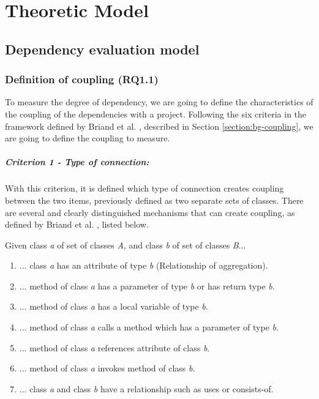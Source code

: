 \chapter{Theoretic Model}\label{ch:TheoreticModel}

\section{Dependency evaluation model}

\subsection{Definition of coupling (RQ1.1)}\label{section:defCoupling}
To measure the degree of dependency, we are going to define the characteristics of the coupling of the dependencies with a project. Following the six criteria in the framework defined by Briand et al. \cite{briand1999unified}, described in Section \ref{section:bg-coupling}, we are going to define the coupling to measure.

\paragraph{Criterion 1 - Type of connection:}
With this criterion, it is defined which type of connection creates coupling between the two items, previously defined as two separate sets of classes. There are several and clearly distinguished mechanisms that can create coupling, as defined by Briand et al. \cite{briand1999unified}, listed below.

\blankls
Given class \textit{a} of set of classes \textit{A}, and class \textit{b} of set of classes \textit{B}...

\begin{enumerate}
  \item ... class \textit{a} has an attribute of type \textit{b} (Relationship of aggregation).
  \item ... method of class \textit{a} has a parameter of type \textit{b} or has return type \textit{b}.
  \item ... method of class \textit{a} has a local variable of type \textit{b}.
  \item ... method of class \textit{a} calls a method which has a parameter of type \textit{b}.
  \item ... method of class \textit{a} references attribute of class \textit{b}.
  \item ... method of class \textit{a} invokes method of class \textit{b}.
  \item ... class \textit{a} and class \textit{b} have a relationship such as uses or consists-of.
\end{enumerate}


